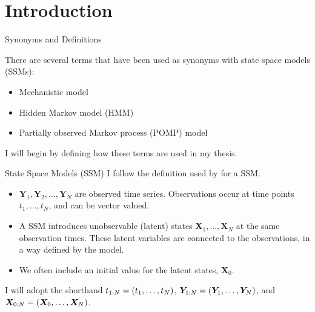 \documentclass[aspectratio=169]{beamer}\usepackage[]{graphicx}\usepackage[]{xcolor}
\begin{document}
\section{Introduction}

\begin{frame}{Synonyms and Definitions}

There are several terms that have been used as synonyms with state space models (SSMs):

\begin{itemize}
  \item Mechanistic model
  \item Hidden Markov model (HMM)
  \item Partially observed Markov process (POMP) model
\end{itemize}

I will begin by defining how these terms are used in my thesis.

\end{frame}

\begin{frame}{State Space Models (SSM)}
  I follow the definition used by \citet{durbin12} for a SSM.
  
  \begin{itemize}
  \item $\bm{Y}_{1}, \bm{Y}_2, \ldots, \bm{Y}_{N}$ are observed time series. 
  Observations occur at time points $t_1, \ldots, t_N$, and can be vector valued. 
  \item A SSM introduces unobservable (latent) states $\bm{X}_1, \ldots, \bm{X}_N$ at the same observation times.
  These latent variables are connected to the observations, in a way defined by the model.
  \item We often include an initial value for the latent states, $\bm{X}_0$.
  \end{itemize}
  
  I will adopt the shorthand $t_{{1}:{N}} = (t_1, \ldots, t_N)$, $\bm{Y}_{{1}:{N}} = (\bm{Y}_{1}, \ldots, \bm{Y}_{N})$, and $\bm{X}_{{0}:{N}} = (\bm{X}_0, \ldots, \bm{X}_N)$.

\end{frame}
\end{document}
